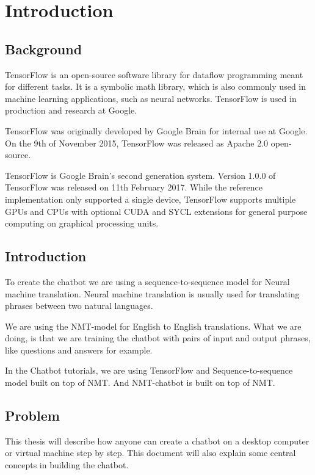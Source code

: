 \documentclass[english, a4paper]{report}
\begin{document}
\chapter{Introduction}
{
    \section{Background} \label{background}
    {
        TensorFlow is an open-source software library for dataflow programming meant for different tasks. It is a symbolic math library, which is also commonly used in machine learning applications, such as neural networks. TensorFlow is used in production and research at Google.
        \par
        TensorFlow was originally developed by Google Brain for internal use at Google. On the 9th of November 2015, TensorFlow was released as Apache 2.0 open-source.
        \par
        TensorFlow is Google Brain's second generation system. Version 1.0.0 of TensorFlow was released on 11th February 2017. While the reference implementation only supported a single device, TensorFlow supports multiple GPUs and CPUs with optional CUDA and SYCL extensions for general purpose computing on graphical processing units.
    }
    
    \section{Introduction}\label{Introduction}
    {
        To create the chatbot we are using a sequence-to-sequence model for Neural machine translation. Neural machine translation is usually used for translating phrases between two natural languages.
        \par
        We are using the NMT-model for English to English translations. What we are doing, is that we are training the chatbot with pairs of input and output phrases, like questions and answers for example. 
        \par
        In the Chatbot tutorials, we are using TensorFlow and Sequence-to-sequence model built on top of NMT. And NMT-chatbot is built on top of NMT.
        
    }
    
    \section{Problem}\label{problem}
    {
        This thesis will describe how anyone can create a chatbot on a desktop computer or virtual machine step by step. This document will also explain some central concepts in building the chatbot.
        
}}
\end{document}
